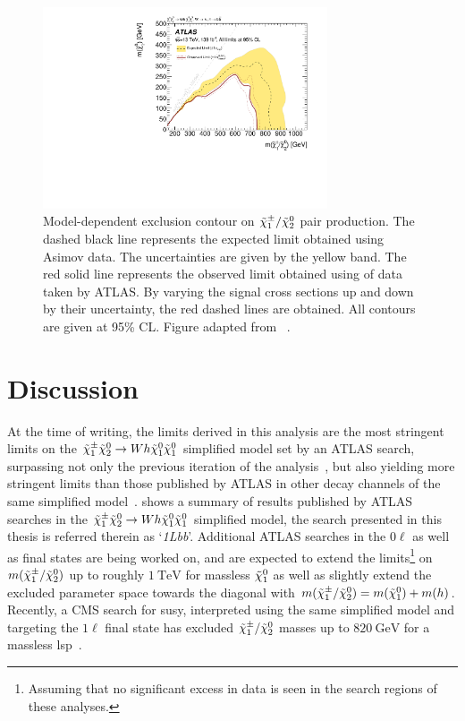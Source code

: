  \begin{figure}
	\centering\includegraphics[width=0.75\textwidth]{contourPlotterWh1Lbb}
	\caption{Model-dependent exclusion contour on $\tilde{\chi}_1^\pm/\tilde{\chi}_2^0$ pair production. The dashed black line represents the expected limit obtained using Asimov data. The uncertainties are given by the yellow band. The red solid line represents the observed limit obtained using \onethirtynineifb of data taken by ATLAS. By varying the signal cross sections up and down by their uncertainty, the red dashed lines are obtained. All contours are given at 95\% CL. Figure adapted from ~\cite{SUSY-2019-08}.}
	\label{fig:result_exclusion}
\end{figure}


\section{Discussion}\label{sec:onelepton_discussion}

At the time of writing, the limits derived in this analysis are the most stringent limits on the $\tilde{\chi}_1^\pm\tilde{\chi}_2^0\rightarrow Wh\tilde{\chi}_1^0\tilde{\chi}_1^0$ simplified model set by an ATLAS search, surpassing not only the previous iteration of the analysis~\cite{SUSY-2017-01}, but also yielding more stringent limits than those published by ATLAS in other decay channels of the same simplified model~\cite{ATL-PHYS-PUB-2020-020}.
 shows a summary of results published by ATLAS searches in the $\tilde{\chi}_1^\pm\tilde{\chi}_2^0\rightarrow Wh\tilde{\chi}_1^0\tilde{\chi}_1^0$ simplified model, the search presented in this thesis is referred therein as `\textit{1Lbb}'. 
Additional ATLAS searches in the $0\ell$ as well as \onelepton final states are being worked on, and are expected to extend the limits\footnote{Assuming that no significant excess in data is seen in the search regions of these analyses.} on $m(\tilde{\chi}_1^\pm/\tilde{\chi}_2^0)$ up to roughly $\SI{1}{\TeV}$ for massless $\tilde{\chi}_1^0$ as well as slightly extend the excluded parameter space towards the diagonal with $m(\tilde{\chi}_1^\pm/\tilde{\chi}_2^0) = m(\tilde{\chi}_1^0) + m(h)$. 
Recently, a CMS search for \gls{susy}, interpreted using the same simplified model and targeting the $1\ell$ final state has excluded $\tilde{\chi}_1^\pm/\tilde{\chi}_2^0$ masses up to $\SI{820}{\GeV}$ for a massless \gls{lsp}~\cite{CMS-PAS-SUS-20-003}.

